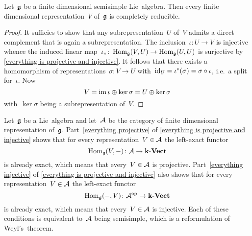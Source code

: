 \begin{theorem}[Weyl]
  Let~$\mathfrak{g}$ be a finite dimensional semisimple Lie~algebra.
  Then every finite dimensional representation~$V$ of~$\mathfrak{g}$ is completely reducible.
\end{theorem}


\begin{proof}
  It sufficies to show that any subrepresentation~$U$ of~$V$ admits a direct complement that is again a subrepresentation.
  The inclusion~$\iota \colon U \to V$ is injective whence the induced linear map~$\iota_* \colon \operatorname{Hom}_{\mathfrak{g}}(V, U) \to \operatorname{Hom}_{\mathfrak{g}}(U, U)$ is surjective by \cref{everything is projective and injective}.
  It follows that there exists a homomorphism of representations~$\sigma \colon V \to U$ with~$\operatorname{id}_U = \iota^*(\sigma) = \sigma \circ \iota$, i.e.\ a split for~$\iota$.
  Now
  \[
    V
    =
    \operatorname{im} \iota \oplus \ker \sigma
    =
    U \oplus \ker \sigma
  \]
  with~$\ker \sigma$ being a subrepresentation of~$V$.
\end{proof}


\begin{remark}
  Let~$\mathfrak{g}$ be a Lie~algebra and let~$\mathcal{A}$ be the category of finite dimensional representation of~$\mathfrak{g}$.  
  Part~\ref*{everything projective} of \cref{everything is projective and injective} shows that for every representation~$V \in \mathcal{A}$ the left-exact functor
  \[
    \operatorname{Hom}_{\mathfrak{g}}(V, -)
    \colon
    \mathcal{A}
    \to
    \mathbf{k}\text{-}\mathbf{Vect}
  \]
  is already exact, which means that every~$V \in \mathcal{A}$ is projective.
  Part~\ref*{everything injective} of \cref{everything is projective and injective} also shows that for every representation~$V \in \mathcal{A}$ the left-exact functor
  \[
    \operatorname{Hom}_{\mathfrak{g}}(-, V)
    \colon
    \mathcal{A}^{\mathrm{op}}
    \to
    \mathbf{k}\text{-}\mathbf{Vect}
  \]
  is already exact, which means that every~$V \in \mathcal{A}$ is injective.
  Each of these conditions is equivalent to~$\mathcal{A}$ being semisimple, which is a reformulation of Weyl’s~theorem.
\end{remark}


